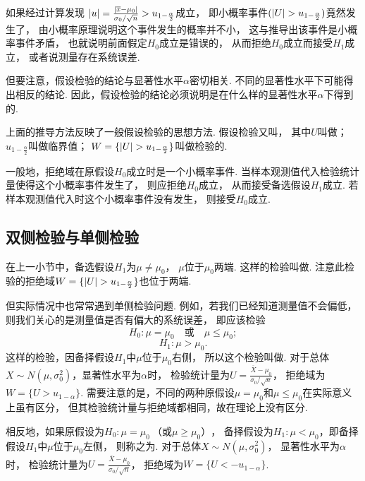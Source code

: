 如果经过计算发现
\(\abs{u}=\frac{\abs{\overline{x}-\mu_0}}{\sigma_0 / \sqrt{n}}>u_{1-\frac{\alpha}{2}}\)成立，
即小概率事件\((\abs{U}>u_{1-\frac{\alpha}{2}})\)竟然发生了，
由小概率原理说明这个事件发生的概率并不小，
这与推导出该事件是小概率事件矛盾，
也就说明前面假定\(H_0\)成立是错误的，
从而拒绝\(H_0\)成立而接受\(H_1\)成立，
或者说测量存在系统误差.

但要注意，假设检验的结论与显著性水平\(\alpha\)密切相关.
不同的显著性水平下可能得出相反的结论.
因此，假设检验的结论必须说明是在什么样的显著性水平\(\alpha\)下得到的.

上面的推导方法反映了一般假设检验的思想方法.
假设检验又叫，
其中\(U\)叫做；
\(u_{1-\frac{\alpha}{2}}\)叫做临界值；
\(W=\{\abs{U}>u_{1-\frac{\alpha}{2}}\}\)叫做检验的.

一般地，拒绝域在原假设\(H_0\)成立时是一个小概率事件.
当样本观测值代入检验统计量使得这个小概率事件发生了，
则应拒绝\(H_0\)成立，
从而接受备选假设\(H_1\)成立.
若样本观测值代入时这个小概率事件没有发生，
则接受\(H_0\)成立.

\subsection{双侧检验与单侧检验}
在上一小节中，备选假设\(H_1\)为\(\mu\neq\mu_0\)，
\(\mu\)位于\(\mu_0\)两端.
这样的检验叫做.
注意此检验的拒绝域\(W=\{\abs{U}>u_{1-\frac{\alpha}{2}}\}\)也位于两端.

但实际情况中也常常遇到单侧检验问题.
例如，若我们已经知道测量值不会偏低，
则我们关心的是测量值是否有偏大的系统误差，
即应该检验\[
	H_0: \mu=\mu_0
	\quad\text{或}\quad
	\mu\leq\mu_0;
\]\[
	H_1: \mu>\mu_0.
\]
这样的检验，因备择假设\(H_1\)中\(\mu\)位于\(\mu_0\)右侧，
所以这个检验叫做.
对于总体\(X \sim N(\mu,\sigma_0^2)\)，显著性水平为\(\alpha\)时，
检验统计量为\(U = \frac{\overline{X}-\mu_0}{\sigma_0 / \sqrt{n}}\)，
拒绝域为\(W=\{U>u_{1-\alpha}\}\).
需要注意的是，不同的两种原假设\(\mu=\mu_0\)和\(\mu\leq\mu_0\)在实际意义上虽有区分，
但其检验统计量与拒绝域都相同，故在理论上没有区分.

相反地，如果原假设为\(H_0: \mu=\mu_0\ \text{（或}\mu\geq\mu_0\text{）}\)，
备择假设为\(H_1: \mu<\mu_0\)，即备择假设\(H_1\)中\(\mu\)位于\(\mu_0\)左侧，
则称之为.
对于总体\(X \sim N(\mu,\sigma_0^2)\)，
显著性水平为\(\alpha\)时，
检验统计量为\(U = \frac{\overline{X}-\mu_0}{\sigma_0 / \sqrt{n}}\)，
拒绝域为\(W=\{U<-u_{1-\alpha}\}\).

